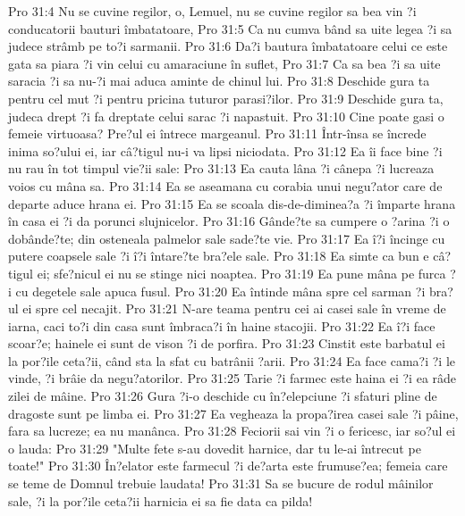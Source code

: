 Pro 31:4  Nu se cuvine regilor, o, Lemuel, nu se cuvine regilor sa bea vin ?i conducatorii bauturi îmbatatoare,
Pro 31:5  Ca nu cumva bând sa uite legea ?i sa judece strâmb pe to?i sarmanii.
Pro 31:6  Da?i bautura îmbatatoare celui ce este gata sa piara ?i vin celui cu amaraciune în suflet,
Pro 31:7  Ca sa bea ?i sa uite saracia ?i sa nu-?i mai aduca aminte de chinul lui.
Pro 31:8  Deschide gura ta pentru cel mut ?i pentru pricina tuturor parasi?ilor.
Pro 31:9  Deschide gura ta, judeca drept ?i fa dreptate celui sarac ?i napastuit.
Pro 31:10  Cine poate gasi o femeie virtuoasa? Pre?ul ei întrece margeanul.
Pro 31:11  Într-însa se încrede inima so?ului ei, iar câ?tigul nu-i va lipsi niciodata.
Pro 31:12  Ea îi face bine ?i nu rau în tot timpul vie?ii sale:
Pro 31:13  Ea cauta lâna ?i cânepa ?i lucreaza voios cu mâna sa.
Pro 31:14  Ea se aseamana cu corabia unui negu?ator care de departe aduce hrana ei.
Pro 31:15  Ea se scoala dis-de-diminea?a ?i împarte hrana în casa ei ?i da porunci slujnicelor.
Pro 31:16  Gânde?te sa cumpere o ?arina ?i o dobânde?te; din osteneala palmelor sale sade?te vie.
Pro 31:17  Ea î?i încinge cu putere coapsele sale ?i î?i întare?te bra?ele sale.
Pro 31:18  Ea simte ca bun e câ?tigul ei; sfe?nicul ei nu se stinge nici noaptea.
Pro 31:19  Ea pune mâna pe furca ?i cu degetele sale apuca fusul.
Pro 31:20  Ea întinde mâna spre cel sarman ?i bra?ul ei spre cel necajit.
Pro 31:21  N-are teama pentru cei ai casei sale în vreme de iarna, caci to?i din casa sunt îmbraca?i în haine stacojii.
Pro 31:22  Ea î?i face scoar?e; hainele ei sunt de vison ?i de porfira.
Pro 31:23  Cinstit este barbatul ei la por?ile ceta?ii, când sta la sfat cu batrânii ?arii.
Pro 31:24  Ea face cama?i ?i le vinde, ?i brâie da negu?atorilor.
Pro 31:25  Tarie ?i farmec este haina ei ?i ea râde zilei de mâine.
Pro 31:26  Gura ?i-o deschide cu în?elepciune ?i sfaturi pline de dragoste sunt pe limba ei.
Pro 31:27  Ea vegheaza la propa?irea casei sale ?i pâine, fara sa lucreze; ea nu manânca.
Pro 31:28  Feciorii sai vin ?i o fericesc, iar so?ul ei o lauda:
Pro 31:29  "Multe fete s-au dovedit harnice, dar tu le-ai întrecut pe toate!"
Pro 31:30  În?elator este farmecul ?i de?arta este frumuse?ea; femeia care se teme de Domnul trebuie laudata!
Pro 31:31  Sa se bucure de rodul mâinilor sale, ?i la por?ile ceta?ii harnicia ei sa fie data ca pilda!


